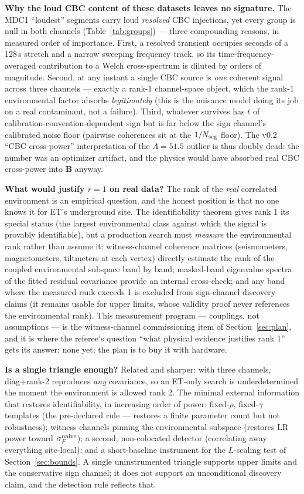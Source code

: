\documentclass[11pt]{article}
\begin{document}
\textbf{Why the loud CBC content of these datasets leaves no signature.} The MDC1 ``loudest'' segments carry loud \emph{resolved} CBC injections, yet every group is null in both channels (Table~\ref{tab:groups}) --- three compounding reasons, in measured order of importance. First, a resolved transient occupies seconds of a 128\,s stretch and a narrow sweeping frequency track, so its time-frequency-averaged contribution to a Welch cross-spectrum is diluted by orders of magnitude. Second, at any instant a single CBC source is \emph{one} coherent signal across three channels --- exactly a rank-1 channel-space object, which the rank-1 environmental factor absorbs \emph{legitimately} (this is the nuisance model doing its job on a real contaminant, not a failure). Third, whatever survives has $t$ of calibration-convention-dependent sign but is far below the sign channel's calibrated noise floor (pairwise coherences sit at the $1/N_{\rm seg}$ floor). The v0.2 ``CBC cross-power'' interpretation of the $\Lambda = 51.5$ outlier is thus doubly dead: the number was an optimizer artifact, and the physics would have absorbed real CBC cross-power into $\mathbf{B}$ anyway.

\textbf{What would justify $r = 1$ on real data?} The rank of the \emph{real} correlated environment is an empirical question, and the honest position is that no one knows it for ET's underground site. The identifiability theorem gives rank 1 its special status (the largest environmental class against which the signal is provably identifiable), but a production search must \emph{measure} the environmental rank rather than assume it: witness-channel coherence matrices (seismometers, magnetometers, tiltmeters at each vertex) directly estimate the rank of the coupled environmental subspace band by band; masked-band eigenvalue spectra of the fitted residual covariance provide an internal cross-check; and any band where the measured rank exceeds 1 is excluded from sign-channel discovery claims (it remains usable for upper limits, whose validity proof never references the environmental rank). This measurement program --- couplings, not assumptions --- is the witness-channel commissioning item of Section~\ref{sec:plan}, and it is where the referee's question ``what physical evidence justifies rank 1'' gets its answer: none yet; the plan is to buy it with hardware.

\textbf{Is a single triangle enough?} Related and sharper: with three channels, diag+rank-2 reproduces \emph{any} covariance, so an ET-only search is underdetermined the moment the environment is allowed rank 2. The minimal external information that restores identifiability, in increasing order of power: fixed-$\rho$, fixed-$\gamma$ templates (the pre-declared rule --- restores a finite parameter count but not robustness); witness channels pinning the environmental subspace (restores LR power toward $\sigma_F^{\rm naive}$); a second, non-colocated detector (correlating away everything site-local); and a short-baseline instrument for the $L$-scaling test of Section~\ref{sec:bounds}. A single uninstrumented triangle supports upper limits and the conservative sign channel; it does not support an unconditional discovery claim, and the detection rule reflects that.
\end{document}

